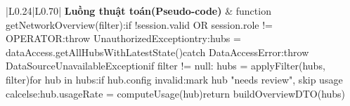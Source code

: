 \begin{longtable}{|L{0.24\textwidth}|L{0.70\textwidth}|}
\textbf{Luồng thuật toán}\newline \textbf{(Pseudo-code)} & function getNetworkOverview(filter):\newline if !session.valid OR session.role != OPERATOR:\newline throw UnauthorizedException\newline try:\newline hubs = dataAccess.getAllHubsWithLatestState()\newline catch DataAccessError:\newline throw DataSourceUnavailableException\newline if filter != null: hubs = applyFilter(hubs, filter)\newline for hub in hubs:\newline if hub.config invalid:\newline mark hub "needs review", skip usage calc\newline else:\newline hub.usageRate = computeUsage(hub)\newline return buildOverviewDTO(hubs) \\
\hline
\end{longtable}
\vspace{-0.5\baselineskip}
